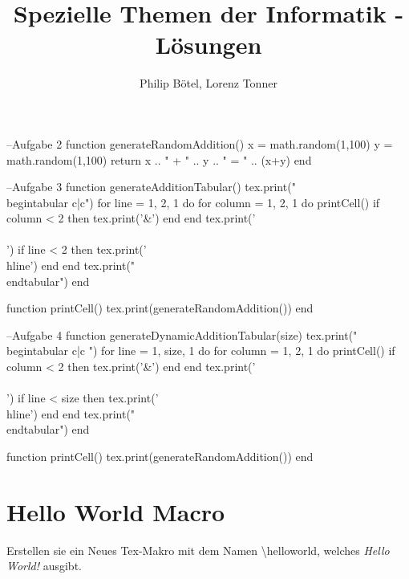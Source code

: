 \documentclass[a4paper]{article}
\title{Spezielle Themen der Informatik - Lösungen}
\author{Philip Bötel, Lorenz Tonner}
\begin{document}
\maketitle
    
\begin{luacode}
    --Aufgabe 2
    function generateRandomAddition()
        x = math.random(1,100)
        y = math.random(1,100)
        return x .. " + " .. y .. " = " .. (x+y)
    end
    
    --Aufgabe 3
    function generateAdditionTabular()
        tex.print("\\begin{tabular} {c|c}")
        for line = 1, 2, 1 do
            for column = 1, 2, 1 do
                printCell()
                if column < 2 then
                    tex.print('&')
                end
            end
            tex.print('\\\\')
            if line < 2 then
                tex.print('\\hline')
            end
        end
        tex.print("\\end{tabular}")
    end

    function printCell()
        tex.print(generateRandomAddition())
    end
    
    --Aufgabe 4
    function generateDynamicAdditionTabular(size)
        tex.print("\\begin{tabular} {c|c} ")
        for line = 1, size, 1 do
            for column = 1, 2, 1 do
                printCell()
                if column < 2 then
                    tex.print('&')
                end
            end
            tex.print('\\\\')
            if line < size then
                tex.print('\\hline')
            end
        end
        tex.print("\\end{tabular}")
    end

    function printCell()
        tex.print(generateRandomAddition())
    end
\end{luacode}


\section{Hello World Macro}
    Erstellen sie ein Neues Tex-Makro mit dem Namen \textbackslash helloworld, welches \textit{Hello World!} ausgibt.
    
    \newcommand{\helloworld}[0]{}
    \helloworld
    
\end{document}
